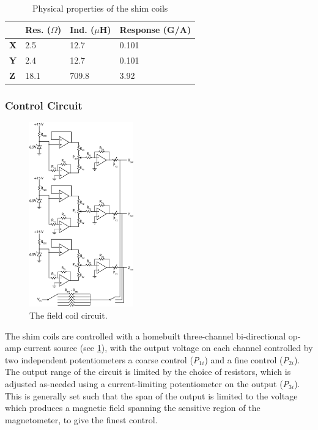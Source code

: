 \documentclass[PaulGanssle-Thesis.tex]{subfiles}
\begin{document}
\begin{center}
\begin{table}
\centering
\begin{tabular}[0.85\textwidth]{|E{0.1\tw}|E{0.25\tw}|E{0.25\tw}|E{0.25\tw}|}
\hline
 & Res. ($\Omega$) & Ind. ($\mu$H) & Response (G/A)\\ \hline
 \textbf{X} & 2.5 & 12.7 & 0.101\\ \hline
 \textbf{Y} & 2.4 & 12.7 & 0.101\\ \hline
 \textbf{Z} & 18.1 & 709.8 & 3.92\\  \hline
\end{tabular}
 \caption{Physical properties of the shim coils}
 \label{tab:FieldCoilProperties}
\end{table}
\end{center}

\subsubsection{Control Circuit}
\label{mag.design.shim.coils.circuit}
\begin{figure}
\includegraphics[width=0.4\textwidth]{figures/magnetometer/FieldCoilCircuit.eps}
\caption{The field coil circuit.}
\label{fig:FieldCoilCircuit}
\vspace{-0.5\lineheight}
\end{figure}

The shim coils are controlled with a homebuilt three-channel bi-directional op-amp current source (see \ref{fig:FieldCoilCircuit}), with the output voltage on each channel controlled by two independent potentiometers a coarse control (\emph{P$_{1i}$}) and a fine control (\emph{P$_{2i}$}). The output range of the circuit is limited by the choice of resistors, which is adjusted as-needed using a current-limiting potentiometer on the output (\emph{P$_{3i}$}). This is generally set such that the span of the output is limited to the voltage which produces a magnetic field spanning the sensitive region of the magnetometer, to give the finest control. 
\end{document}

